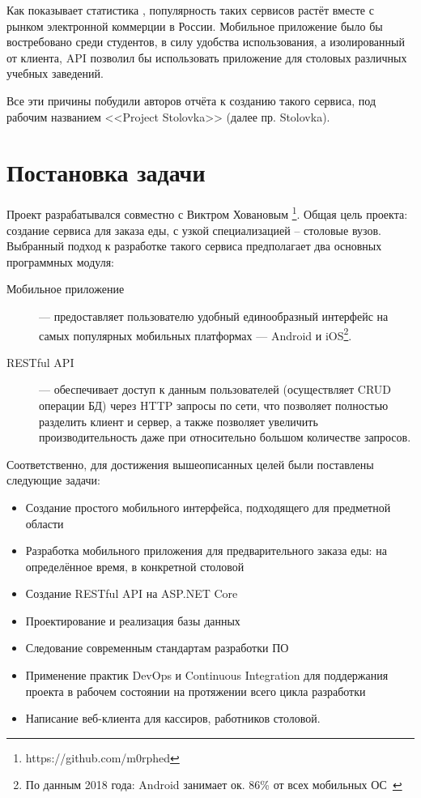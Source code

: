 \documentclass[14pt]{matmex-diploma-custom}
\begin{document}
	Как показывает статистика \cite{russian_ecommerce_market}, популярность таких сервисов растёт вместе с рынком электронной коммерции в России.
	Мобильное приложение было бы востребовано среди студентов, в силу удобства использования, а изолированный от клиента, API позволил бы использовать приложение для столовых различных учебных заведений.

	Все эти причины побудили авторов отчёта к созданию такого сервиса, под рабочим названием <<Project Stolovka>> (далее пр. Stolovka).

\section{Постановка задачи}
	Проект разрабатывался совместно с Виктром Ховановым \footnote{https://github.com/m0rphed}.
	Общая цель проекта: создание сервиса для заказа еды, с узкой специализацией – столовые вузов.
	Выбранный подход к разработке такого сервиса предполагает два основных программных модуля:
	\begin{description}
	    \item[Мобильное приложение] — предоставляет пользователю удобный единообразный интерфейс на самых популярных мобильных платформах — Android и iOS\footnote{По данным 2018 года: Android занимает ок. 86\%  от всех мобильных ОС~\cite{gartner_mobile_os_share}}.
	    \item[RESTful API] — обеспечивает доступ к данным пользователей (осуществляет CRUD операции БД) через HTTP запросы по сети, что позволяет полностью разделить клиент и сервер, а также позволяет увеличить производительность даже при относительно большом количестве запросов.
	\end{description}
	Соответственно, для достижения вышеописанных целей были поставлены следующие задачи:
	\begin{itemize}
	    \item Создание простого мобильного интерфейса, подходящего для предметной области
	    \item Разработка мобильного приложения для предварительного заказа еды: на определённое время, в конкретной столовой
	    \item Создание RESTful API на ASP.NET Core \cite{rest_xamarin}
	    \item Проектирование и реализация базы данных
	    \item Следование современным стандартам разработки ПО
	    \item Применение практик DevOps и Continuous Integration для поддержания проекта в рабочем состоянии на протяжении всего цикла разработки
	    \item Написание веб-клиента для кассиров, работников столовой.
	\end{itemize}
\end{document}
